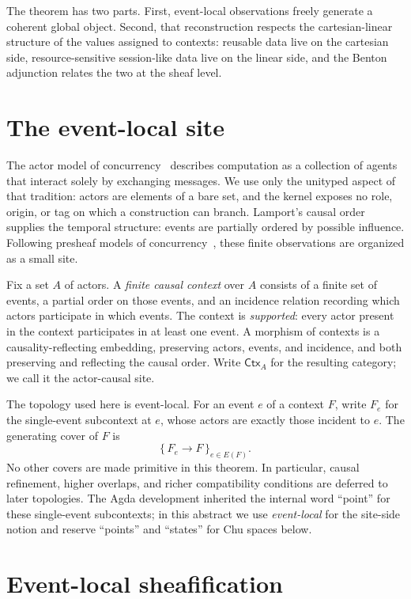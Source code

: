 \documentclass[11pt]{article}
\newcommand{\Ctx}{\mathsf{Ctx}}
\begin{document}
The theorem has two parts. First, event-local observations freely generate a
coherent global object. Second, that reconstruction respects the
cartesian-linear structure of the values assigned to contexts: reusable data
live on the cartesian side, resource-sensitive session-like data live on the
linear side, and the Benton adjunction relates the two at the sheaf level.

\section*{The event-local site}

The actor model of concurrency~\cite{Hewitt1973} describes computation as a
collection of agents that interact solely by exchanging messages. We use only
the unityped aspect of that tradition: actors are elements of a bare set, and
the kernel exposes no role, origin, or tag on which a construction can branch.
Lamport's causal order~\cite{Lamport1978} supplies the temporal structure:
events are partially ordered by possible influence. Following
presheaf models of concurrency~\cite{CattaniWinskel1996}, these finite
observations are organized as a small site.

Fix a set $A$ of actors. A \emph{finite causal context} over $A$ consists of a
finite set of events, a partial order on those events, and an incidence relation
recording which actors participate in which events. The context is
\emph{supported}: every actor present in the context participates in at least one
event. A morphism of contexts is a causality-reflecting embedding, preserving
actors, events, and incidence, and both preserving and reflecting the causal
order. Write $\Ctx_A$ for the resulting category; we call it the actor-causal
site.

The topology used here is event-local. For an event $e$ of a context $F$, write
$F_e$ for the single-event subcontext at $e$, whose actors are exactly those
incident to $e$. The generating cover of $F$ is
\[
  \{\,F_e\longrightarrow F\,\}_{e\in E(F)}.
\]
No other covers are made primitive in this theorem. In particular, causal
refinement, higher overlaps, and richer compatibility conditions are deferred to
later topologies. The Agda development inherited the internal word ``point'' for
these single-event subcontexts; in this abstract we use \emph{event-local} for
the site-side notion and reserve ``points'' and ``states'' for Chu spaces below.

\section*{Event-local sheafification}
\end{document}
